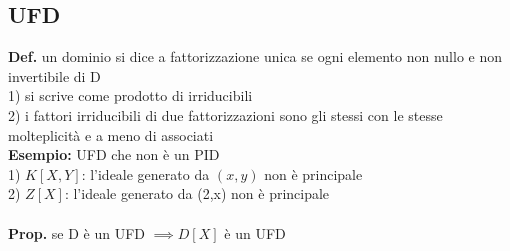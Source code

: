 \documentclass[10pt,a4paper]{article}
\begin{document}
\subsection{UFD}
\textbf{Def.} un dominio si dice a fattorizzazione unica se ogni elemento non nullo e non invertibile di D\\
1) si scrive come prodotto di irriducibili\\
2) i fattori irriducibili di due fattorizzazioni sono gli stessi con le stesse molteplicità e a meno di associati\\
\textbf{Esempio:} UFD che non è un PID\\
1) $K[X,Y]$: l'ideale generato da $(x,y)$ non è principale\\
2) $Z[X]$: l'ideale generato da (2,x) non è principale\\\\
\textbf{Prop.} se D è un UFD $ \implies D[X]$ è un UFD
\newpage
\end{document}
